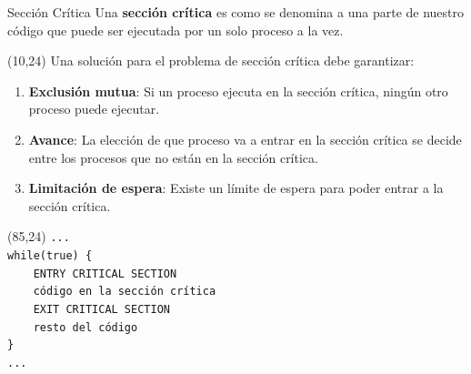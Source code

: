 \documentclass[aspectratio=169]{beamer}
\begin{document}
\begin{frame}[fragile,t]{Sección Crítica}
    Una \textcolor{naranjauca}{\textbf{sección crítica}} es como se denomina a una parte de nuestro código que puede ser ejecutada por un solo proceso a la vez.\\
    \begin{textblock}{70}(10,24)
    Una solución para el problema de sección crítica debe garantizar:
    \begin{enumerate}
    \item \textbf{Exclusión mutua}: Si un proceso ejecuta en la sección crítica, ningún otro proceso puede ejecutar.
    \item \textbf{Avance}: La elección de que proceso va a entrar en la sección crítica se decide entre los procesos que no están en la sección crítica.
    \item \textbf{Limitación de espera}: Existe un límite de espera para poder entrar a la sección crítica.
    \end{enumerate}
    \end{textblock}
    \begin{textblock}{70}(85,24)
    \verb|...|\\
    \verb|while(true) {|\\
    \vspace{0.2cm}
    \color{verdeuca}
    \verb|    ENTRY CRITICAL SECTION|\\
    \vspace{0.2cm}
    \color{red}
    \verb|    código en la sección crítica|\\
    \vspace{0.2cm}
    \color{verdeuca}
    \verb|    EXIT CRITICAL SECTION|\\
    \vspace{0.2cm}
    \color{black}
    \verb|    resto del código|\\
    \vspace{0.2cm}
    \verb|}|\\
    \verb|...|\\
    \end{textblock}
\end{frame}
\end{document}
